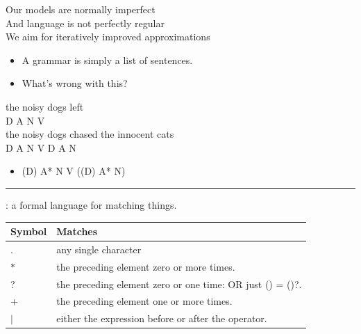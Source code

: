 \documentclass[a4paper,landscape,headrule,footrule]{foils}
\begin{document}
\begin{center}
  Our models are normally imperfect \\
  And language is not perfectly regular \\
We aim for iteratively improved approximations
\end{center}






\begin{itemize}
\item A grammar is simply a list of sentences.
\item What’s wrong with this?
\end{itemize}

\begin{exe}
  \ex \gll the noisy dogs left \\
  D A N V \\ 
  \ex  \gll the noisy dogs chased the innocent cats \\
 D A N V D A N \\
\end{exe}
\begin{itemize}
\item (D) A* N V ((D) A* N)
\end{itemize}
\hrule
{}: a formal language for matching things.
\\[2ex]
 \begin{tabular}{ll}
    Symbol & Matches \\ \hline
    . & any single character\\
    $*$ &	the preceding element zero or more times. \\
    ? &	 the preceding element zero or one time: OR just () = ()?. \\
    + &	 the preceding element one or more times. \\
    $|$ &  either the expression before or after the operator. \\
  \end{tabular}
\end{document}
